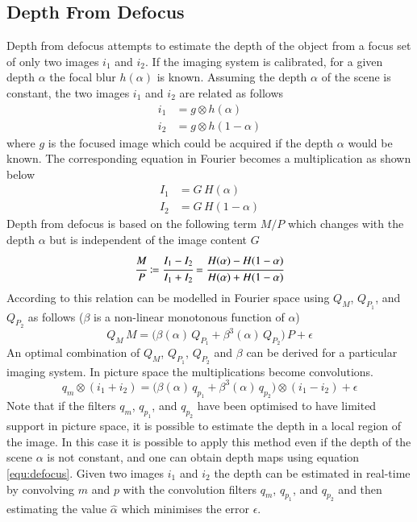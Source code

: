\documentclass[a4paper,12pt]{book}
\begin{document}
\subsection{Depth From Defocus}
Depth from defocus attempts to estimate the depth of the object
from a focus set of only two images $i_1$ and $i_2$\cite{RefWorks:142}.
If the imaging system is calibrated, for a given depth $\alpha$ the focal blur
$h(\alpha)$ is known. Assuming the depth $\alpha$ of the scene is constant,
the two images $i_1$ and $i_2$ are related as follows
\begin{equation*}
  \begin{split}
    i_1&=g\otimes h(\alpha)\\
    i_2&=g\otimes h(1-\alpha)
  \end{split}
\end{equation*}
where $g$ is the focused image which could be acquired if the depth $\alpha$
would be known. The corresponding equation in Fourier becomes a multiplication
as shown below
\begin{equation*}
  \begin{split}
    I_1&=G\,H(\alpha)\\
    I_2&=G\,H(1-\alpha)
  \end{split}
\end{equation*}
Depth from defocus is based on the following term $M/P$ which changes with
the depth $\alpha$ but is independent of the image content $G$
\begin{equation*} %
  \cfrac{M}{P}\coloneqq\cfrac{I_1-I_2}{I_1+I_2}=\cfrac{H(\alpha)-H(1-\alpha)}{H(\alpha)+H(1-\alpha)}
\end{equation*}
According to \cite{RefWorks:142} this relation can be modelled in Fourier
space using $Q_M$, $Q_{P_1}$, and $Q_{P_2}$ as follows
($\beta$ is a non-linear monotonous function of $\alpha$)
\begin{equation*} %
  Q_M\,M=\big(\beta(\alpha)\,Q_{P_1}+\beta^3(\alpha)\,Q_{P_2}\big)\,P+\epsilon
\end{equation*}
An optimal combination of $Q_M$, $Q_{P_1}$, $Q_{P_2}$ and $\beta$ can be
derived for a particular imaging system. In picture space the multiplications
become convolutions.
\begin{equation}\label{equ:defocus}
  q_m\otimes(i_1+i_2)=\big(\beta(\alpha)\,q_{p_1}+\beta^3(\alpha)\,q_{p_2}\big)\otimes (i_1-i_2)+\epsilon
\end{equation}
Note that if the filters $q_m$, $q_{p_1}$, and $q_{p_2}$ have been optimised
to have limited support in picture space, it is possible to estimate the depth
in a local region of the image. In this case it is possible to apply this
method even if the depth of the scene $\alpha$ is not constant, and one can
obtain depth maps using equation \ref{equ:defocus}.
Given two images $i_1$ and $i_2$ the depth can be estimated in real-time by
convolving $m$ and $p$ with the convolution filters $q_m$, $q_{p_1}$, and
$q_{p_2}$ and then estimating the value $\widehat{\alpha}$ which minimises
the error $\epsilon$.
\end{document}

